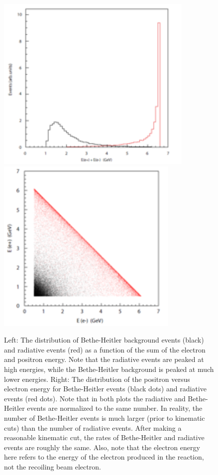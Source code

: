 \begin{figure}
\includegraphics[scale=1.4]{measurements/rad-bh-energy.pdf}
\includegraphics[scale=1.4]{measurements/E1vsE2.pdf}
\caption{ Left: The distribution of Bethe-Heitler background events (black) and radiative events (red) as a function of the sum of the electron and positron energy. Note that the radiative events  are peaked at high energies, while the Bethe-Heitler background is peaked at much lower energies. Right: The distribution of the positron versus electron energy for Bethe-Heitler  events (black dots) and radiative events (red dots). Note that in both plots the radiative and Bethe-Heitler events  are normalized to the same number. In reality, the number of Bethe-Heitler  events is much larger (prior to kinematic cuts) than the number of radiative events. After making a reasonable kinematic cut, the rates of Bethe-Heitler and radiative events are roughly the same.  Also, note that the electron energy here refers to the energy of the electron produced in the reaction, not the recoiling beam electron.}
\label{fig:tridentkinematics}
\end{figure}




